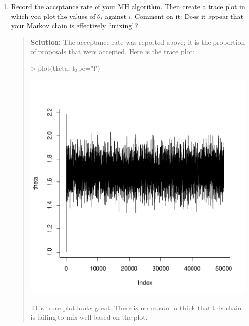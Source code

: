 \documentclass{article}
\begin{document}
\begin{enumerate}
\begin{enumerate}
      \item Record the acceptance rate of your MH algorithm. Then create a trace
      plot in which you plot the values of $\theta_i$ against $i$. Comment on
      it: Does it appear that your Markov chain is effectively ``mixing''?
      \begin{quotation}{\bf Solution:}
      The acceptance rate was reported above; it is the proportion of
      proposals that were accepted.
      Here is the trace plot:
\begin{Schunk}
\begin{Sinput}
> plot(theta, type="l")
\end{Sinput}
\end{Schunk}
\includegraphics{sol11-002}
      
      This trace plot looks great.  There is no reason to think that this chain is failing to mix well based
      on the plot.
      \end{quotation}
      

\end{enumerate}
\end{enumerate}
\end{document}
